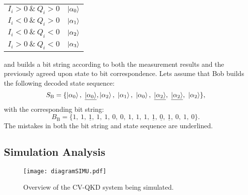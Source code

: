 \begin{enumerate}
\begin{table}[H]
\begin{tabular}{c|c}
$I_i>0~\&~Q_i>0$ & $\ket{\alpha_0}$ \\
$I_i<0~\&~Q_i>0$ & $\ket{\alpha_1}$ \\
$I_i<0~\&~Q_i<0$ & $\ket{\alpha_2}$ \\
$I_i>0~\&~Q_i<0$ & $\ket{\alpha_3}$
\end{tabular}
\end{table}
and builds a bit string according to both the measurement results and the previously agreed upon state to bit correspondence. Lets assume that Bob builds the following decoded state sequence:
\begin{equation*}
S_\text{B}=\lbrace\ket{\alpha_0},~\underline{\ket{\alpha_0}},\ket{\alpha_2},~\ket{\alpha_1},~\ket{\alpha_0},~\underline{\ket{\alpha_2}},~\underline{\ket{\alpha_2}},~\ket{\alpha_2}\rbrace,
\end{equation*}
with the corresponding bit string:
\begin{equation*}
B_\text{B}=\lbrace1,~1,~\underline{1},~1,~1,~0,~0,~1,~1,~1,~\underline{1},~\underline{0},~\underline{1},~0,~1,~0\rbrace.
\end{equation*}
The mistakes in both the bit string and state sequence are underlined.
\end{enumerate}




\subsection{Simulation Analysis}

\begin{figure}[h]
\centering
\texttt{[image: diagramSIMU.pdf]}
\caption{Overview of the CV-QKD system being simulated.}
\label{fig:CV-System}
\end{figure}

